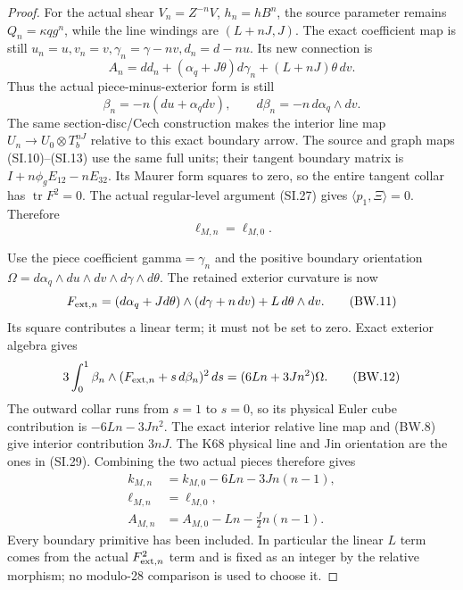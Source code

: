 \begin{proof}
For the actual shear \(V_n=Z^{-n}V\), \(h_n=hB^n\), the source parameter
remains \(Q_n=\kappa qg^n\), while the line windings are \((L+nJ,J)\).
The exact coefficient map is still \(u_n=u,v_n=v,\gamma_n=\gamma-nv,
d_n=d-nu\). Its new connection is
\[
 A_n=dd_n+(\alpha_q+J\theta)d\gamma_n+(L+nJ)\theta\,dv.
\]
Thus the actual piece-minus-exterior form is still
\[
 \beta_n=-n(du+\alpha_qdv),\qquad d\beta_n=-n\,d\alpha_q\wedge dv.
                                                        \tag{BW.9}
\]
The same section-disc/Cech construction makes the interior line map
\(U_n\to U_0\otimes T_b^{nJ}\) relative to this exact boundary arrow.
The source and graph maps (SI.10)--(SI.13) use the same full units;
their tangent boundary matrix is \(I+n\phi_gE_{12}-nE_{32}\).
Its Maurer form squares to zero, so the entire tangent collar has
\(\operatorname{tr}F^2=0\). The actual regular-level argument (SI.27)
gives \(\langle p_1,\Xi\rangle=0\). Therefore
\[
                         \ell_{M,n}=\ell_{M,0}.        \tag{BW.10}
\]

Use the piece coefficient gamma\(=\gamma_n\) and the positive boundary
orientation \(\Omega=d\alpha_q\wedge du\wedge dv\wedge d\gamma\wedge d\theta\).
The retained exterior curvature is now
\[
 F_{{\rm ext},n}=(d\alpha_q+Jd\theta)\wedge(d\gamma+n\,dv)
                                      +L\,d\theta\wedge dv.
                                                        \tag{BW.11}
\]
Its square contributes a linear term; it must not be set to zero.
Exact exterior algebra gives
\[
 3\int_0^1\beta_n\wedge
             (F_{{\rm ext},n}+s\,d\beta_n)^2\,ds
                  =(6Ln+3Jn^2)\Omega.                \tag{BW.12}
\]
The outward collar runs from \(s=1\) to \(s=0\), so its physical Euler
cube contribution is \(-6Ln-3Jn^2\). The exact interior relative line
map and (BW.8) give interior contribution \(3nJ\). The K68 physical
line and Jin orientation are the ones in (SI.29). Combining the
two actual pieces therefore gives
\[
 \begin{aligned}
 k_{M,n}&=k_{M,0}-6Ln-3Jn(n-1),\\
 \ell_{M,n}&=\ell_{M,0},\\
 A_{M,n}&=A_{M,0}-Ln-\tfrac J2n(n-1).
 \end{aligned}                                      \tag{BW.13}
\]
Every boundary primitive has been included. In particular the
linear \(L\) term comes from the actual \(F_{{\rm ext},n}^2\) term and
is fixed as an integer by the relative morphism; no modulo-28
comparison is used to choose it.


\end{proof}
